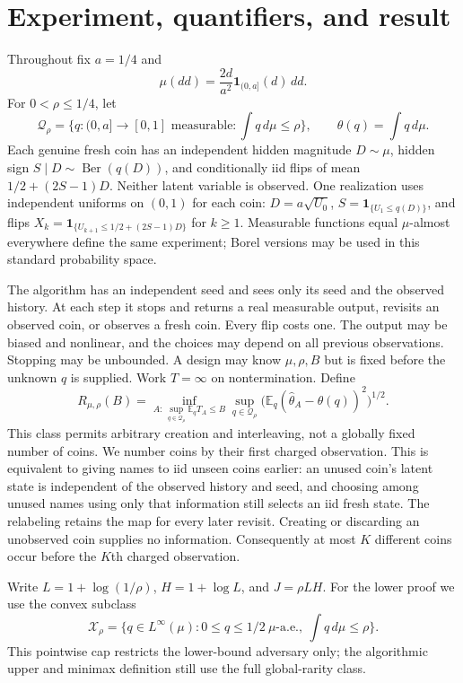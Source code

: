 \documentclass[11pt]{article}
\newcommand{\E}{\mathbb E}
\newcommand{\ind}{\mathbf1}
\newcommand{\Xrho}{\mathcal X_\rho}
\begin{document}
\section{Experiment, quantifiers, and result}
Throughout fix $a=1/4$ and
\[
 \mu(dd)=\frac{2d}{a^2}\ind_{(0,a]}(d)\,dd.
\]
For $0<\rho\le1/4$, let
\[
 \mathcal Q_\rho=\{q:(0,a]\to[0,1]\text{ measurable}:\int q\,d\mu\le\rho\},
 \qquad \theta(q)=\int q\,d\mu.
\]
Each genuine fresh coin has an independent hidden magnitude $D\sim\mu$,
hidden sign $S\mid D\sim\operatorname{Ber}(q(D))$, and conditionally iid
flips of mean $1/2+(2S-1)D$. Neither latent variable is observed. One realization
uses independent uniforms on $(0,1)$ for each coin: $D=a\sqrt{U_0}$,
$S=\ind_{\{U_1\le q(D)\}}$, and flips
$X_k=\ind_{\{U_{k+1}\le1/2+(2S-1)D\}}$ for $k\ge1$. Measurable functions
equal $\mu$-almost everywhere define the same experiment; Borel versions may
be used in this standard probability space.

The algorithm has an independent seed and sees only its seed and the observed
history. At each step it stops and returns a real measurable output, revisits
an observed coin, or observes a fresh coin. Every flip costs one. The output
may be biased and nonlinear, and the choices may depend on all previous
observations. Stopping may be unbounded. A design may know $\mu,\rho,B$ but is
fixed before the unknown $q$ is supplied. Work $T=\infty$ on nontermination.
Define
\[
 R_{\mu,\rho}(B)=\inf_{A:\,\sup_{q\in\mathcal Q_\rho}\E_qT_A\le B}
       \sup_{q\in\mathcal Q_\rho}\bigl(\E_q(\widehat\theta_A-\theta(q))^2\bigr)^{1/2}.
\]
This class permits arbitrary creation and interleaving, not a globally fixed
number of coins. We number coins by their first charged observation. This
is equivalent to giving names to iid unseen coins earlier: an unused coin's
latent state is independent of the observed history and seed, and choosing
among unused names using only that information still selects an iid fresh
state. The relabeling retains the map for every later revisit. Creating or
discarding an unobserved coin supplies no information. Consequently at most
$K$ different coins occur before the $K$th charged observation.

Write $L=1+\log(1/\rho)$, $H=1+\log L$, and $J=\rho LH$.
For the lower proof we use the convex subclass
\[
 \Xrho=\{q\in L^\infty(\mu):0\le q\le1/2\ \mu\text{-a.e.},\ \int q\,d\mu\le\rho\}.
\]
This pointwise cap restricts the lower-bound adversary only; the algorithmic
upper and minimax definition still use the full global-rarity class.
\end{document}
